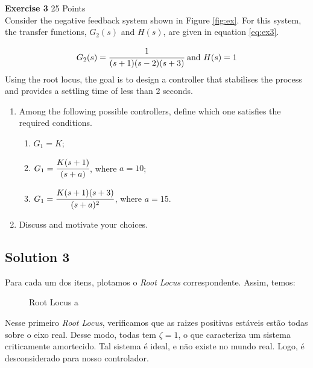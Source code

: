 \documentclass[a4paper,11pt]{article}
\begin{document}
{\Large \noindent \bf Exercise 3} \hfill					25 Points\\

\noindent Consider the negative feedback system shown in Figure \ref{fig:ex}. For this system, the transfer functions, $G_2(s)$ and $H(s)$, are given in equation \ref{eq:ex3}.

\begin{equation}
G_2(s)=\cfrac{1}{(s+1)(s-2)(s+3)} \ \text{and} \ H(s)=1
\label{eq:ex3}
\end{equation}
\vskip0.1cm
\noindent Using the root locus, the goal is to design a controller that stabilises the process and provides a settling time of less than 2 seconds. 
\begin{enumerate}
\item Among the following possible controllers, define which one satisfies the required conditions.
\begin{enumerate}
\item $G_1=K$;
\item $G_1=\cfrac{K(s+1)}{(s+a)}$, where $a=10$;
\item $G_1=\cfrac{K(s+1)(s+3)}{(s+a)^2}$, where $a=15$.
\end{enumerate}
\item Discuss and motivate your choices.
\end{enumerate}
\subsection*{Solution 3}
Para cada um dos itens, plotamos o \textit{Root Locus} correspondente. Assim, temos:
\begin{figure}[H]
	\caption{Root Locus a}
	\label{fig:key}
\end{figure}

Nesse primeiro \textit{Root Locus}, verificamos que as raizes positivas estáveis estão todas sobre o eixo real. Desse modo, todas tem $\zeta = 1$, o que caracteriza um sistema criticamente amortecido. Tal sistema é ideal, e não existe no mundo real. Logo, é desconsiderado para nosso controlador.
\end{document}
